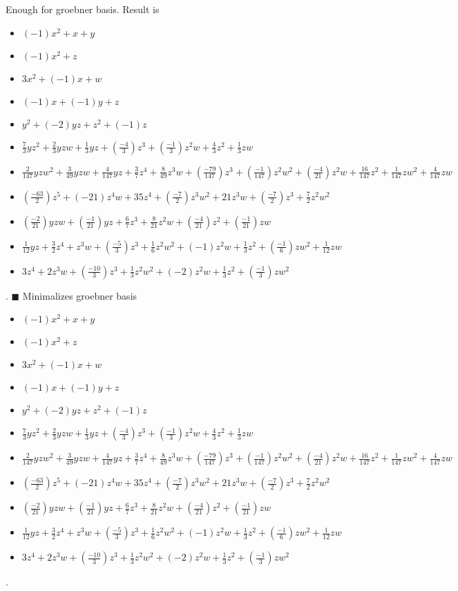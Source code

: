 \documentclass{jsarticle}
\begin{document}
Enough for groebner basis.  Result is \begin{itemize}
\item $(-1)x^{2}+x+y$
\item $(-1)x^{2}+z$
\item $3x^{2}+(-1)x+w$
\item $(-1)x+(-1)y+z$
\item $y^{2}+(-2)yz+z^{2}+(-1)z$
\item $\frac{7}{3}yz^{2}+\frac{2}{3}yzw+\frac{1}{3}yz+(\frac{-4}{3})z^{3}+(\frac{-1}{3})z^{2}w+\frac{4}{3}z^{2}+\frac{1}{3}zw$
\item $\frac{2}{147}yzw^{2}+\frac{3}{49}yzw+\frac{4}{147}yz+\frac{3}{7}z^{4}+\frac{8}{49}z^{3}w+(\frac{-79}{147})z^{3}+(\frac{-1}{147})z^{2}w^{2}+(\frac{-4}{21})z^{2}w+\frac{16}{147}z^{2}+\frac{1}{147}zw^{2}+\frac{4}{147}zw$
\item $(\frac{-63}{2})z^{5}+(-21)z^{4}w+35z^{4}+(\frac{-7}{2})z^{3}w^{2}+21z^{3}w+(\frac{-7}{2})z^{3}+\frac{7}{2}z^{2}w^{2}$
\item $(\frac{-2}{21})yzw+(\frac{-1}{21})yz+\frac{6}{7}z^{3}+\frac{8}{21}z^{2}w+(\frac{-4}{21})z^{2}+(\frac{-1}{21})zw$
\item $\frac{1}{12}yz+\frac{3}{2}z^{4}+z^{3}w+(\frac{-5}{3})z^{3}+\frac{1}{6}z^{2}w^{2}+(-1)z^{2}w+\frac{1}{3}z^{2}+(\frac{-1}{6})zw^{2}+\frac{1}{12}zw$
\item $3z^{4}+2z^{3}w+(\frac{-10}{3})z^{3}+\frac{1}{3}z^{2}w^{2}+(-2)z^{2}w+\frac{1}{3}z^{2}+(\frac{-1}{3})zw^{2}$
\end{itemize}  . 
$\blacksquare{}$
Minimalizes groebner basis 
\begin{itemize}
\item $(-1)x^{2}+x+y$
\item $(-1)x^{2}+z$
\item $3x^{2}+(-1)x+w$
\item $(-1)x+(-1)y+z$
\item $y^{2}+(-2)yz+z^{2}+(-1)z$
\item $\frac{7}{3}yz^{2}+\frac{2}{3}yzw+\frac{1}{3}yz+(\frac{-4}{3})z^{3}+(\frac{-1}{3})z^{2}w+\frac{4}{3}z^{2}+\frac{1}{3}zw$
\item $\frac{2}{147}yzw^{2}+\frac{3}{49}yzw+\frac{4}{147}yz+\frac{3}{7}z^{4}+\frac{8}{49}z^{3}w+(\frac{-79}{147})z^{3}+(\frac{-1}{147})z^{2}w^{2}+(\frac{-4}{21})z^{2}w+\frac{16}{147}z^{2}+\frac{1}{147}zw^{2}+\frac{4}{147}zw$
\item $(\frac{-63}{2})z^{5}+(-21)z^{4}w+35z^{4}+(\frac{-7}{2})z^{3}w^{2}+21z^{3}w+(\frac{-7}{2})z^{3}+\frac{7}{2}z^{2}w^{2}$
\item $(\frac{-2}{21})yzw+(\frac{-1}{21})yz+\frac{6}{7}z^{3}+\frac{8}{21}z^{2}w+(\frac{-4}{21})z^{2}+(\frac{-1}{21})zw$
\item $\frac{1}{12}yz+\frac{3}{2}z^{4}+z^{3}w+(\frac{-5}{3})z^{3}+\frac{1}{6}z^{2}w^{2}+(-1)z^{2}w+\frac{1}{3}z^{2}+(\frac{-1}{6})zw^{2}+\frac{1}{12}zw$
\item $3z^{4}+2z^{3}w+(\frac{-10}{3})z^{3}+\frac{1}{3}z^{2}w^{2}+(-2)z^{2}w+\frac{1}{3}z^{2}+(\frac{-1}{3})zw^{2}$
\end{itemize}  . 
\end{document}
